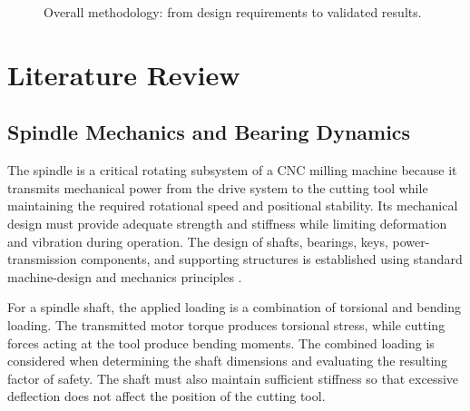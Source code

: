 \documentclass[12pt,a4paper]{report}
\begin{document}
\begin{figure}[htbp]
		\caption{Overall methodology: from design requirements to validated results.}
		\label{fig:methodology}
	\end{figure}
	
	\chapter{Literature Review}
	
	\section{Spindle Mechanics and Bearing Dynamics}
	The spindle is a critical rotating subsystem of a CNC milling machine because it transmits mechanical power from the drive system to the cutting tool while maintaining the required rotational speed and positional stability. Its mechanical design must provide adequate strength and stiffness while limiting deformation and vibration during operation. The design of shafts, bearings, keys, power-transmission components, and supporting structures is established using standard machine-design and mechanics principles \cite{ref1,ref2,ref3}.
	
	For a spindle shaft, the applied loading is a combination of torsional and bending loading. The transmitted motor torque produces torsional stress, while cutting forces acting at the tool produce bending moments. The combined loading is considered when determining the shaft dimensions and evaluating the resulting factor of safety. The shaft must also maintain sufficient stiffness so that excessive deflection does not affect the position of the cutting tool.
	
\end{document}
